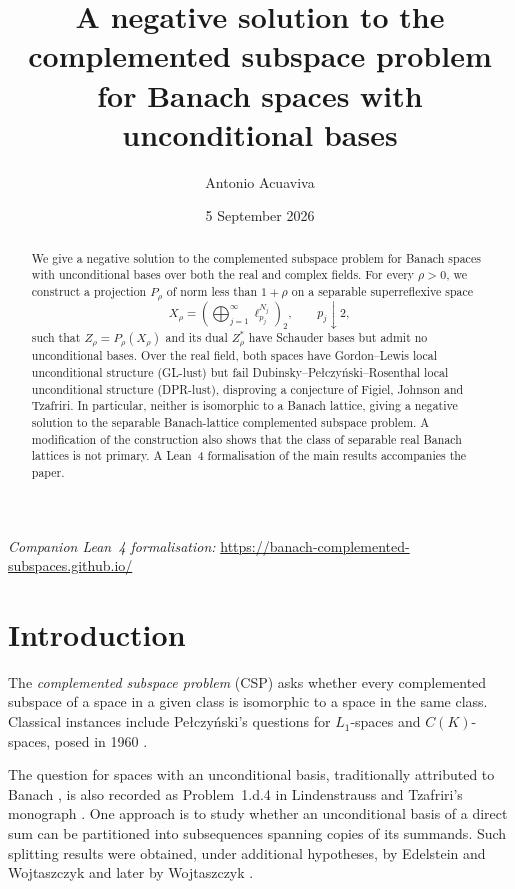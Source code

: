 \documentclass[11pt,a4paper,reqno]{amsart}
\title[The complemented subspace problem]{A negative solution to the complemented subspace problem for Banach spaces with unconditional bases}
\author[A.~Acuaviva]{Antonio Acuaviva}
\date{5 September 2026}
\theoremstyle{definition}
\numberwithin{equation}{section}
\begin{document}
\begin{abstract}
We give a negative solution to the complemented subspace problem for Banach spaces with unconditional bases over both the real and complex fields. For every $\rho>0$, we construct a projection $P_\rho$ of norm less than $1+\rho$ on a separable superreflexive space
\begin{equation*}
 X_\rho=\left(\bigoplus_{j=1}^{\infty}\ell_{p_j}^{N_j}\right)_2,
 \qquad p_j\downarrow2,
\end{equation*}
such that $Z_\rho=P_\rho(X_\rho)$ and its dual $Z_\rho^*$ have Schauder bases but admit no unconditional bases. Over the real field, both spaces have Gordon--Lewis local unconditional structure (GL-lust) but fail Dubinsky--Pe\l czy\'nski--Rosenthal local unconditional structure (DPR-lust), disproving a conjecture of Figiel, Johnson and Tzafriri. In particular, neither is isomorphic to a Banach lattice, giving a negative solution to the separable Banach-lattice complemented subspace problem. A modification of the construction also shows that the class of separable real Banach lattices is not primary. A Lean~4 formalisation of the main results accompanies the paper.
\end{abstract}
\maketitle

\begin{center}
\emph{Companion Lean~4 formalisation:}
\url{https://banach-complemented-subspaces.github.io/}
\end{center}

\tableofcontents

\section{Introduction}\label{sec:main}

The \emph{complemented subspace problem} (CSP) asks whether every complemented subspace of a space in a given class is isomorphic to a space in the same class. Classical instances include Pe\l czy\'nski's questions for $L_1$-spaces and $C(K)$-spaces, posed in 1960 \cite[p.~210]{Pelczynski1960}.

The question for spaces with an unconditional basis, traditionally attributed to Banach \cite{DeHeviaEtAl2025}, is also recorded as Problem~1.d.4 in Lindenstrauss and Tzafriri's monograph \cite[p.~27]{LindenstraussTzafriri1977}. One approach is to study whether an unconditional basis of a direct sum can be partitioned into subsequences spanning copies of its summands. Such splitting results were obtained, under additional hypotheses, by Edelstein and Wojtaszczyk \cite{EdelsteinWojtaszczyk1976} and later by Wojtaszczyk \cite{Wojtaszczyk1978}.
\end{document}
